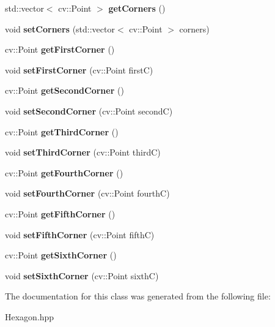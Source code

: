 \begin{DoxyCompactItemize}
\item 
\mbox{\label{class_hexagon_aa12df068505254931530cbe74ac85ad0}} 
std\+::vector$<$ cv\+::\+Point $>$ {\bfseries get\+Corners} ()
\item 
\mbox{\label{class_hexagon_a1b5cdb94637901f346373429660af3b1}} 
void {\bfseries set\+Corners} (std\+::vector$<$ cv\+::\+Point $>$ corners)
\item 
\mbox{\label{class_hexagon_a03b1555323dbe6ed2733472d11dfb01f}} 
cv\+::\+Point {\bfseries get\+First\+Corner} ()
\item 
\mbox{\label{class_hexagon_a56bb6cd8dda0f66e4e8f353b457d8e5a}} 
void {\bfseries set\+First\+Corner} (cv\+::\+Point firstC)
\item 
\mbox{\label{class_hexagon_a3134efead863824a2db0b42e8a4698e4}} 
cv\+::\+Point {\bfseries get\+Second\+Corner} ()
\item 
\mbox{\label{class_hexagon_aeb7dbc2511331034bd072d840f1894e3}} 
void {\bfseries set\+Second\+Corner} (cv\+::\+Point secondC)
\item 
\mbox{\label{class_hexagon_acdbb0fa10098d61f42809720ff219698}} 
cv\+::\+Point {\bfseries get\+Third\+Corner} ()
\item 
\mbox{\label{class_hexagon_a8a857b838f7ae19110d6aa3f060c5c87}} 
void {\bfseries set\+Third\+Corner} (cv\+::\+Point thirdC)
\item 
\mbox{\label{class_hexagon_a15f6a1197a4e4a185df1138accfccc05}} 
cv\+::\+Point {\bfseries get\+Fourth\+Corner} ()
\item 
\mbox{\label{class_hexagon_ae01630a9e0562825a532177e7bcf3d9f}} 
void {\bfseries set\+Fourth\+Corner} (cv\+::\+Point fourthC)
\item 
\mbox{\label{class_hexagon_aaf5fa1d278ebf23ed50340314975bb50}} 
cv\+::\+Point {\bfseries get\+Fifth\+Corner} ()
\item 
\mbox{\label{class_hexagon_a9cebb22093a571ac3b8977972d5a4c69}} 
void {\bfseries set\+Fifth\+Corner} (cv\+::\+Point fifthC)
\item 
\mbox{\label{class_hexagon_a03bbc0fb0a05c1e0e2c9510a63390f01}} 
cv\+::\+Point {\bfseries get\+Sixth\+Corner} ()
\item 
\mbox{\label{class_hexagon_a73a32eadb0235385ccd2fc89cb922801}} 
void {\bfseries set\+Sixth\+Corner} (cv\+::\+Point sixthC)
\end{DoxyCompactItemize}


The documentation for this class was generated from the following file\+:\begin{DoxyCompactItemize}
\item 
Hexagon.\+hpp\end{DoxyCompactItemize}
